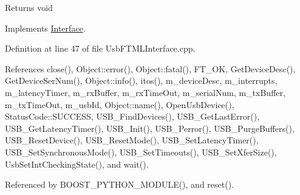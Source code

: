 \begin{DoxyReturn}{Returns}
void 
\end{DoxyReturn}


Implements \hyperlink{classInterface_a1d095c113b1e89d1f5f68323856fee63}{Interface}.

Definition at line 47 of file UsbFTMLInterface.cpp.

References close(), Object::error(), Object::fatal(), FT\_\-OK, GetDeviceDesc(), GetDeviceSerNum(), Object::info(), itos(), m\_\-deviceDesc, m\_\-interrupts, m\_\-latencyTimer, m\_\-rxBuffer, m\_\-rxTimeOut, m\_\-serialNum, m\_\-txBuffer, m\_\-txTimeOut, m\_\-usbId, Object::name(), OpenUsbDevice(), StatusCode::SUCCESS, USB\_\-FindDevices(), USB\_\-GetLastError(), USB\_\-GetLatencyTimer(), USB\_\-Init(), USB\_\-Perror(), USB\_\-PurgeBuffers(), USB\_\-ResetDevice(), USB\_\-ResetMode(), USB\_\-SetLatencyTimer(), USB\_\-SetSynchronousMode(), USB\_\-SetTimeouts(), USB\_\-SetXferSize(), UsbSetIntCheckingState(), and wait().

Referenced by BOOST\_\-PYTHON\_\-MODULE(), and reset().


